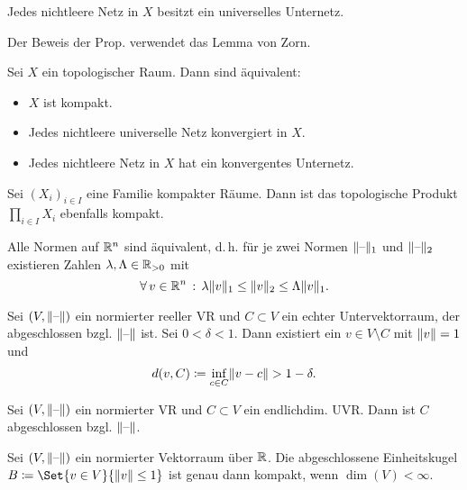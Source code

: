 \documentclass{cheat-sheet}
\begin{document}

\begin{prop}
  Jedes nichtleere Netz in $X$ besitzt ein universelles Unternetz.
\end{prop}

\begin{bem}
  Der Beweis der Prop. verwendet das Lemma von Zorn.
\end{bem}

\begin{satz}
  Sei $X$ ein topologischer Raum. Dann sind äquivalent:
  \begin{itemize}
    \item $X$ ist kompakt.
    \item Jedes nichtleere universelle Netz konvergiert in $X$.
    \item Jedes nichtleere Netz in $X$ hat ein konvergentes Unternetz.
  \end{itemize}
\end{satz}

\begin{satz}[Tychonoff]
  Sei $(X_i)_{i \in I}$ eine Familie kompakter Räume. Dann ist das topologische Produkt $\prod_{i \in I} X_i$ ebenfalls kompakt.
\end{satz}


\begin{lem}
  Alle Normen auf $\mathbb{R}^n$ sind äquivalent, d.\,h. für je zwei Normen $\lVert\text{--}\rVert_1$ und $\lVert\text{--}\rVert_2$ existieren Zahlen $\lambda, \Lambda \in \mathbb{R}_{> 0}$ mit
  \[ \forall \, {v \in \mathbb{R}^n} \,:\, \lambda \lVert v\rVert_1 \leq \lVert v\rVert_2 \leq \Lambda \lVert v\rVert_1. \]
\end{lem}

\begin{lem}[Riesz]
  Sei $(V, \lVert\text{--}\rVert)$ ein normierter reeller VR und $C \subset V$ ein echter Untervektorraum, der abgeschlossen bzgl. $\lVert\text{--}\rVert$ ist. Sei $0 < \delta < 1$. Dann existiert ein $v \in V \setminus C$ mit $\lVert v\rVert = 1$ und
  \[ d(v, C) \coloneqq \inf_{c \in C} \lVert v - c\rVert > 1 - \delta. \]
\end{lem}

\begin{lem}
  Sei $(V, \lVert\text{--}\rVert)$ ein normierter VR und $C \subset V$ ein endlichdim. UVR. Dann ist $C$ abgeschlossen bzgl. $\lVert\text{--}\rVert$.
\end{lem}

\begin{prop}
  Sei $(V, \lVert\text{--}\rVert)$ ein normierter Vektorraum über $\mathbb{R}$. Die abgeschlossene Einheitskugel $B \coloneqq \Set{ v \in V }{ \norm{v} \leq 1 }$ ist genau dann kompakt, wenn $\dim(V) < \infty$.
\end{prop}
\end{document}
